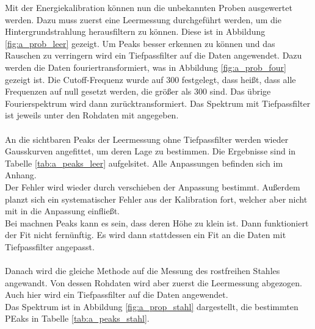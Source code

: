 \documentclass[12pt,a4paper]{article}
\begin{document}
Mit der Energiekalibration können nun die unbekannten Proben ausgewertet werden. Dazu muss zuerst eine Leermessung durchgeführt werden, um die Hintergrundstrahlung herausfiltern zu können. Diese ist in Abbildung \ref{fig:a_prob_leer} gezeigt. Um Peaks besser erkennen zu können und das Rauschen zu verringern wird ein Tiefpassfilter auf die Daten angewendet. Dazu werden die Daten fouriertransformiert, was in Abbildung \ref{fig:a_prob_four} gezeigt ist. Die Cutoff-Frequenz wurde auf 300 festgelegt, dass heißt, dass alle Frequenzen auf null gesetzt werden, die größer als 300 sind. Das übrige Fourierspektrum wird dann zurücktransformiert. Das Spektrum mit Tiefpassfilter ist jeweils unter den Rohdaten mit angegeben.\\
\\
An die sichtbaren Peaks der Leermessung ohne Tiefpassfilter werden wieder Gausskurven angefittet, um deren Lage zu bestimmen. Die Ergebnisse sind in Tabelle \ref{tab:a_peaks_leer} aufgelsitet. Alle Anpassungen befinden sich im Anhang.\\
Der Fehler wird wieder durch verschieben der Anpassung bestimmt. Außerdem planzt sich ein systematischer Fehler aus der Kalibration fort, welcher aber nicht mit in die Anpassung einfließt.\\
Bei machnen Peaks kann es sein, dass deren Höhe zu klein ist. Dann funktioniert der Fit nicht fernünftig. Es wird dann stattdessen ein Fit an die Daten mit Tiefpassfilter angepasst.\\
\\
Danach wird die gleiche Methode auf die Messung des rostfreihen Stahles angewandt. 
Von dessen Rohdaten wird aber zuerst die Leermessung abgezogen. 
Auch hier wird ein Tiefpassfilter auf die Daten angewendet.\\
Das Spektrum ist in Abbildung \ref{fig:a_prop_stahl} dargestellt, die bestimmten PEaks in Tabelle \ref{tab:a_peaks_stahl}.
\end{document}
